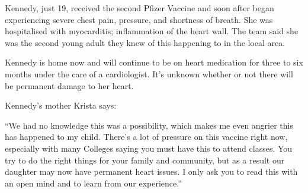 Kennedy, just 19, received the second Pfizer Vaccine and soon after began
experiencing severe chest pain, pressure, and shortness of breath. She was
hospitalised with myocarditis; inflammation of the heart wall. The team said she
was the second young adult they knew of this happening to in the local area.

Kennedy is home now and will continue to be on heart medication for three to six
months under the care of a cardiologist. It’s unknown whether or not there will
be permanent damage to her heart.

Kennedy’s mother Krista says:

“We had no knowledge this was a possibility, which makes me even angrier this
has happened to my child. There’s a lot of pressure on this vaccine right now,
especially with many Colleges saying you must have this to attend classes. You
try to do the right things for your family and community, but as a result our
daughter may now have permanent heart issues. I only ask you to read this with
an open mind and to learn from our experience.”


